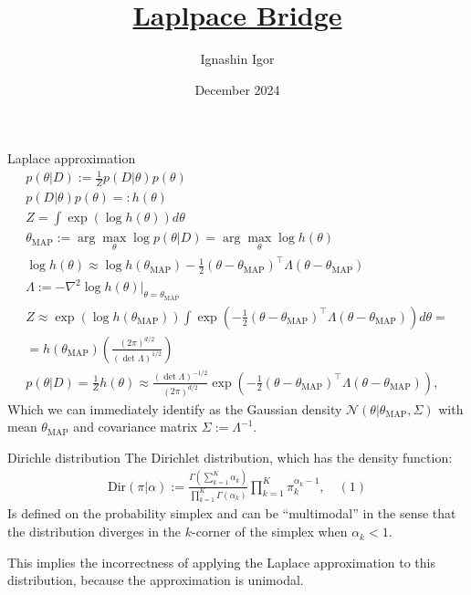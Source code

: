 \documentclass{beamer}
\title[\hbox to 56mm{\href{https://arxiv.org/pdf/2003.01227}{Laplace Bridge}}]{\href{https://arxiv.org/pdf/2002.03495}{Laplpace Bridge}}
\author[Ignashin Igor]{Ignashin Igor}
\institute{Bayesian multimodeling \\
Department of Intelligent Systems, MIPT}
\date{December 2024}
\begin{document}
\begin{frame}
\thispagestyle{empty}
\maketitle
\end{frame}
\begin{frame}{Laplace approximation}
\footnotesize
\begin{gather*}
    p(\theta | D) := \frac{1}{Z} p(D | \theta) p(\theta) \\
    p(D | \theta) p(\theta) =: h(\theta) \\
    Z = \int \exp(\log h(\theta)) d\theta \\ 
    \theta_{\text{MAP}} := \arg \max_\theta \log p(\theta | D) = \arg \max_\theta \log h(\theta) \\ 
    \log h(\theta) \approx \log h(\theta_{\text{MAP}}) - \frac{1}{2} (\theta - \theta_{\text{MAP}})^{\top} \Lambda (\theta - \theta_{\text{MAP}}) \\    
    \Lambda := -\nabla^2 \log h(\theta) \big|_{\theta = \theta_{\text{MAP}}} \\
    Z \approx \exp(\log h(\theta_{\text{MAP}})) \int \exp \left( -\frac{1}{2} (\theta - \theta_{\text{MAP}})^{\top} \Lambda (\theta - \theta_{\text{MAP}}) \right) d\theta = \\
    = h(\theta_{\text{MAP}}) \left( \frac{(2\pi)^{d/2}}{(\det \Lambda)^{1/2}} \right) \\ 
    p(\theta | D) = \frac{1}{Z} h(\theta) \approx \frac{(\det \Lambda)^{-1/2}}{(2\pi)^{d/2}} \exp \left( -\frac{1}{2} (\theta - \theta_{\text{MAP}})^{\top} \Lambda (\theta - \theta_{\text{MAP}}) \right),
\end{gather*}
 Which we can immediately identify as the Gaussian density $\mathcal{N}(\theta | \theta_{\text{MAP}}, \Sigma)$ with mean $\theta_{\text{MAP}}$ and covariance matrix $\Sigma := \Lambda^{-1}$.

\end{frame}

\begin{frame}{Dirichle distribution}
The Dirichlet distribution, which has the density function:
\begin{gather*}
    \text{Dir}(\pi | \alpha) := \frac{\Gamma\left(\sum_{k=1}^{K} \alpha_k\right)}{\prod_{k=1}^{K} \Gamma(\alpha_k)} \prod_{k=1}^{K} \pi_k^{\alpha_k - 1}, \quad (1)
\end{gather*}
Is defined on the probability simplex and can be “multimodal” in the sense that the distribution diverges in the \( k \)-corner of the simplex when \( \alpha_k < 1 \). 

This implies the incorrectness of applying the Laplace approximation to this distribution, because the approximation is unimodal.

\end{frame}
\end{document}
